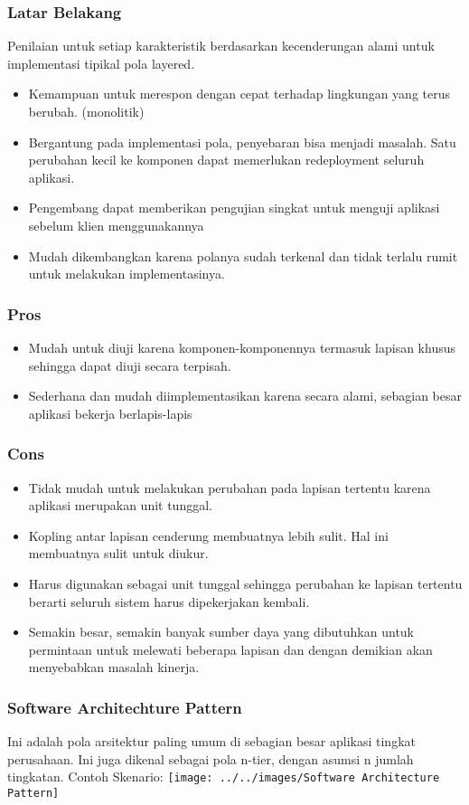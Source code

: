 \documentclass{beamer}
\begin{document}
\begin{frame}
	\frametitle{Latar Belakang}
	Penilaian untuk setiap karakteristik berdasarkan kecenderungan alami untuk implementasi tipikal pola layered.
	\begin{itemize}
		\item Kemampuan untuk merespon dengan cepat terhadap lingkungan yang terus berubah. (monolitik)
		\item Bergantung pada implementasi pola, penyebaran bisa menjadi masalah. Satu perubahan kecil ke komponen dapat memerlukan redeployment seluruh aplikasi.
		\item Pengembang dapat memberikan pengujian singkat untuk menguji aplikasi sebelum klien menggunakannya
		\item Mudah dikembangkan karena polanya sudah terkenal dan tidak terlalu rumit untuk melakukan implementasinya.
	\end{itemize}
\end{frame}

\begin{frame}
	\frametitle{Pros}
	\begin{itemize}
		\item Mudah untuk diuji karena komponen-komponennya termasuk lapisan khusus sehingga dapat diuji secara terpisah.
		\item Sederhana dan mudah diimplementasikan karena secara alami, sebagian besar aplikasi bekerja berlapis-lapis
	\end{itemize}
\end{frame}

\begin{frame}
	\frametitle{Cons}
	\begin{itemize}
		\item Tidak mudah untuk melakukan perubahan pada lapisan tertentu karena aplikasi merupakan unit tunggal.
		\item Kopling antar lapisan cenderung membuatnya lebih sulit. Hal ini membuatnya sulit untuk diukur.
		\item Harus digunakan sebagai unit tunggal sehingga perubahan ke lapisan tertentu berarti seluruh sistem harus dipekerjakan kembali.
		\item Semakin besar, semakin banyak sumber daya yang dibutuhkan untuk permintaan untuk melewati beberapa lapisan dan dengan demikian akan menyebabkan masalah kinerja.
	\end{itemize}
\end{frame}

\begin{frame}
	\frametitle{Software Architechture Pattern}
	Ini adalah pola arsitektur paling umum di sebagian besar aplikasi tingkat perusahaan. Ini juga dikenal sebagai pola n-tier, dengan asumsi n jumlah tingkatan. Contoh Skenario:
	\texttt{[image: ../../images/Software Architecture Pattern]}
\end{frame}
\end{document}
